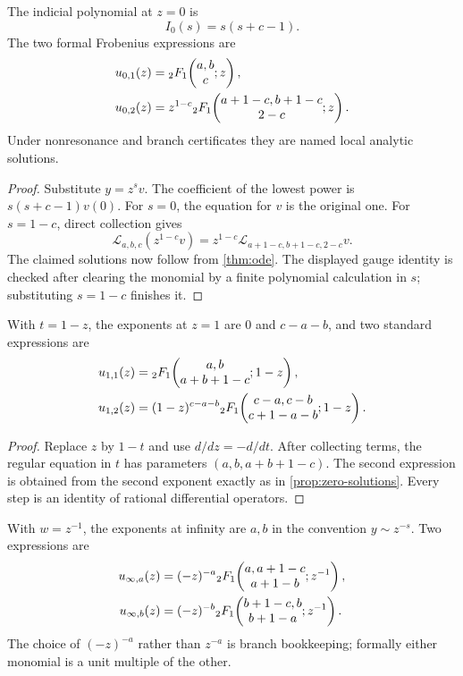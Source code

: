 \begin{proposition}\label{prop:zero-solutions}
The indicial polynomial at \(z=0\) is
\[
 I_0(s)=s(s+c-1).
\]
The two formal Frobenius expressions are
\begin{align}
 u_{0,1}(z)&={}_2F_1\!\left(\begin{matrix}a,b\\c\end{matrix};z\right),\label{eq:u01}\\
 u_{0,2}(z)&=z^{1-c}
   {}_2F_1\!\left(\begin{matrix}a+1-c,b+1-c\\2-c\end{matrix};z\right).
   \label{eq:u02}
\end{align}
Under nonresonance and branch certificates they are named local analytic
solutions.
\end{proposition}

\begin{proof}
Substitute \(y=z^sv\).  The coefficient of the lowest power is
\(s(s+c-1)v(0)\).  For \(s=0\), the equation for \(v\) is the original one.
For \(s=1-c\), direct collection gives
\[
 \mathcal L_{a,b,c}(z^{1-c}v)
 =z^{1-c}\mathcal L_{a+1-c,b+1-c,2-c}v.
\]
The claimed solutions now follow from \cref{thm:ode}.  The displayed gauge
identity is checked after clearing the monomial by a finite polynomial
calculation in \(s\); substituting \(s=1-c\) finishes it.
\end{proof}

\begin{proposition}\label{prop:one-solutions}
With \(t=1-z\), the exponents at \(z=1\) are \(0\) and \(c-a-b\), and two
standard expressions are
\begin{align}
 u_{1,1}(z)&={}_2F_1\!\left(\begin{matrix}a,b\\a+b+1-c\end{matrix};1-z\right),\label{eq:u11}\\
 u_{1,2}(z)&=(1-z)^{c-a-b}
  {}_2F_1\!\left(\begin{matrix}c-a,c-b\\c+1-a-b\end{matrix};1-z\right).
  \label{eq:u12}
\end{align}
\end{proposition}

\begin{proof}
Replace \(z\) by \(1-t\) and use \(d/dz=-d/dt\).  After collecting terms,
the regular equation in \(t\) has parameters
\((a,b,a+b+1-c)\).  The second expression is obtained from the second
exponent exactly as in \cref{prop:zero-solutions}.  Every step is an identity
of rational differential operators.
\end{proof}

\begin{proposition}\label{prop:infty-solutions}
With \(w=z^{-1}\), the exponents at infinity are \(a,b\) in the convention
\(y\sim z^{-s}\).  Two expressions are
\begin{align}
 u_{\infty,a}(z)&=(-z)^{-a}
   {}_2F_1\!\left(\begin{matrix}a,a+1-c\\a+1-b\end{matrix};z^{-1}\right),\label{eq:uinf-a}\\
 u_{\infty,b}(z)&=(-z)^{-b}
   {}_2F_1\!\left(\begin{matrix}b+1-c,b\\b+1-a\end{matrix};z^{-1}\right).
   \label{eq:uinf-b}
\end{align}
The choice of \((-z)^{-a}\) rather than \(z^{-a}\) is branch bookkeeping;
formally either monomial is a unit multiple of the other.
\end{proposition}

